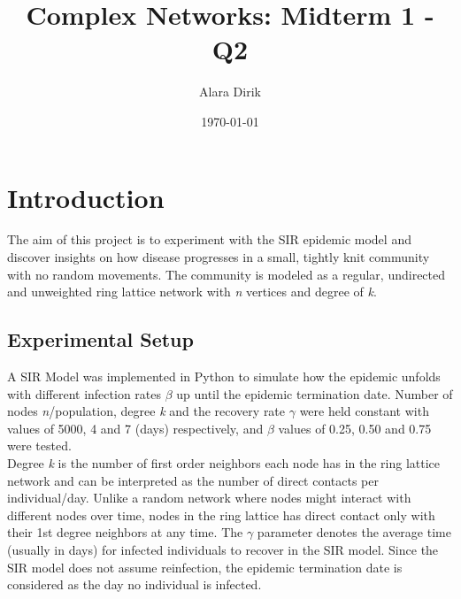 \documentclass{article}
\title{Complex Networks: Midterm 1 - Q2}
\author{Alara Dirik}
\date\today
\begin{document}
\maketitle 
\newpage
\section*{Introduction}
The aim of this project is to experiment with the SIR epidemic model and discover insights on how disease progresses in a small, tightly knit community with no random movements. The community is modeled as a regular, undirected and unweighted ring lattice network with {\it n} vertices and degree of {\it k}. 


\subsection*{Experimental Setup}
A SIR Model was implemented in Python to simulate how the epidemic unfolds with different infection rates $\beta$ up until the epidemic termination date. Number of nodes {\it n}/population, degree {\it k} and the recovery rate $\gamma$ were held constant with values of 5000, 4 and 7 (days) respectively, and $\beta$ values of 0.25, 0.50 and 0.75 were tested. \\

\noindent
Degree {\it k} is the number of first order neighbors each node has in the ring lattice network and can be interpreted as the number of direct contacts per individual/day. Unlike a random network where nodes might interact with different nodes over time, nodes in the ring lattice has direct contact only with their 1st degree neighbors at any time. The $\gamma$ parameter denotes the average time (usually in days) for infected individuals to recover in the SIR model. Since the SIR model does not assume reinfection, the epidemic termination date is considered as the day no individual is infected. \\
\end{document}
